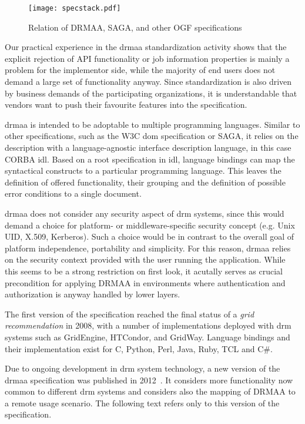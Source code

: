 \documentclass[twocolumn]{svjour3}       %
\begin{document}
\begin{figure}
  \texttt{[image: specstack.pdf]}
\caption{Relation of DRMAA, SAGA, and other OGF specifications}
\label{fig:specstack} 
\end{figure}


Our practical experience in the \gls{drmaa} standardization activity shows that the explicit rejection of API functionality or job information properties is mainly a problem for the implementor side, while the majority of end users does not demand a large set of functionality anyway. Since standardization is also driven by business demands of the participating organizations, it is understandable that vendors want to push their favourite features into the specification.

\gls{drmaa} is intended to be adoptable to multiple programming languages. Similar to other specifications, such as the W3C \gls{dom} specification or SAGA, it relies on the description with a language-agnostic interface description language, in this case CORBA \gls{idl}. Based on a root specification in \gls{idl}, language bindings can map the syntactical constructs to a particular programming language. This leaves the definition of offered functionality, their grouping and the definition of possible error conditions to a single document.

\gls{drmaa} does not consider any security aspect of \gls{drm} systems, since this would demand a choice for platform- or middleware-specific security concept (e.g. Unix UID, X.509, Kerberos). Such a choice would be in contrast to the overall goal of platform independence, portability and simplicity. For this reason, \gls{drmaa} relies on the security context provided with the user running the application. While this seems to be a strong restriction on first look, it acutally serves as crucial precondition for applying DRMAA in environments where authentication and authorization is anyway handled by lower layers. 

The first version of the specification reached the final status of a \emph{grid recommendation} in 2008, with a number of implementations deployed with \gls{drm} systems such as GridEngine, HTCondor, and GridWay. Language bindings and their implementation exist for C, Python, Perl, Java, Ruby, TCL and C\#. 

Due to ongoing development in \gls{drm} system technology, a new version of the \gls{drmaa} specification was published in 2012~\cite{citemaster_9274}. It considers more functionality now common to different \gls{drm} systems and considers also the mapping of DRMAA to a remote usage scenario. The following text refers only to this version of the specification.
\end{document}
